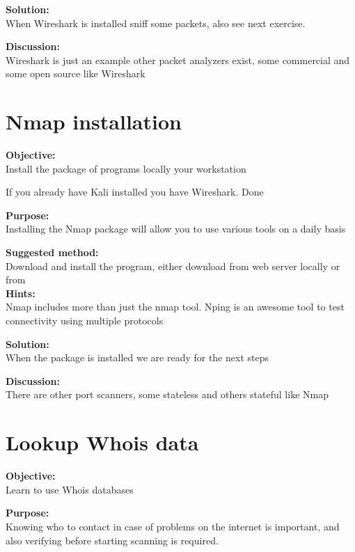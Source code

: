 \documentclass[a4paper,11pt,notitlepage]{report}
\begin{document}
{\bf Solution:}\\
When Wireshark is installed sniff some packets, also see next exercise.

{\bf Discussion:}\\
Wireshark is just an example other packet analyzers exist, some commercial and some open source like Wireshark


\chapter{Nmap installation}

\label{ex:nmap-install}



{\bf Objective:}\\
Install the package of programs locally your workstation

If you already have Kali installed you have Wireshark. Done

{\bf Purpose:}\\
Installing the Nmap package will allow you to use various tools on a daily basis

{\bf Suggested method:}\\
Download and install the program, either download from web server locally or from \\

{\bf Hints:}\\
Nmap includes more than just the nmap tool. Nping is an awesome tool to test connectivity using multiple protocols

{\bf Solution:}\\
When the package is installed we are ready for the next steps

{\bf Discussion:}\\
There are other port scanners, some stateless and others stateful like Nmap

\chapter{Lookup Whois data}
\label{ex:whois}


{\bf Objective:} \\
Learn to use Whois databases

{\bf Purpose:}\\
Knowing who to contact in case of problems on the internet is important, and also verifying before starting scanning is required.
\end{document}
